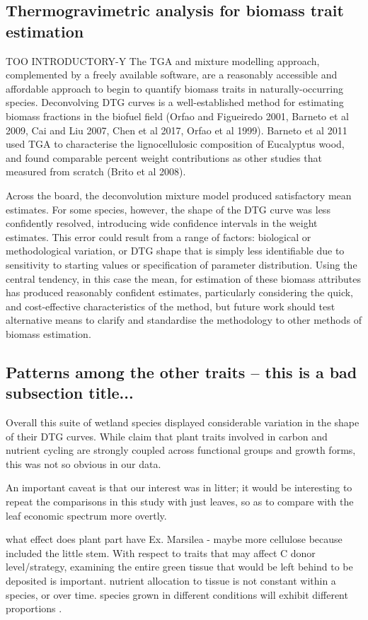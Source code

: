 \documentclass{article}
\begin{document}
\subsection{Thermogravimetric analysis for biomass trait estimation}
TOO INTRODUCTORY-Y
The TGA and mixture modelling approach, complemented by a freely available software, are a reasonably accessible and affordable approach to begin to quantify biomass traits in naturally-occurring species. Deconvolving DTG curves is a well-established method for estimating biomass fractions in the biofuel field (Orfao and Figueiredo 2001, Barneto et al 2009, Cai and Liu 2007, Chen et al 2017, Orfao et al 1999). Barneto et al 2011 used TGA to characterise the lignocellulosic composition of Eucalyptus wood, and found comparable percent weight contributions as other studies that measured from scratch (Brito et al 2008). 

Across the board, the deconvolution mixture model produced satisfactory mean estimates. For some species, however, the shape of the DTG curve was less confidently resolved, introducing wide confidence intervals in the weight estimates. This error could result from a range of factors: biological or methodological variation, or DTG shape that is simply less identifiable due to sensitivity to starting values or specification of parameter distribution. Using the central tendency, in this case the mean, for estimation of these biomass attributes has produced reasonably confident estimates, particularly considering the quick, and cost-effective characteristics of the method, but future work should test alternative means to clarify and standardise the methodology to other methods of biomass estimation. 

\subsection{Patterns among the other traits -- this is a bad subsection title...}
Overall this suite of wetland species displayed considerable variation in the shape of their DTG curves. While \citet{dedeyn2008} claim that plant traits involved in carbon and nutrient cycling are strongly coupled across functional groups and growth forms, this was not so obvious in our data. 

An important caveat is that our interest was in litter; it would be interesting to repeat the comparisons in this study with just leaves, so as to compare with the leaf economic spectrum more overtly. 

what effect does plant part have
Ex. Marsilea - maybe more cellulose because included the little stem. 
With respect to traits that may affect C donor level/strategy, examining the entire green tissue that would be left behind to be deposited is important. 
nutrient allocation to tissue is not constant within a species, or over time. species grown in different conditions will exhibit different proportions \cite{fornara2012}. 
\end{document}
